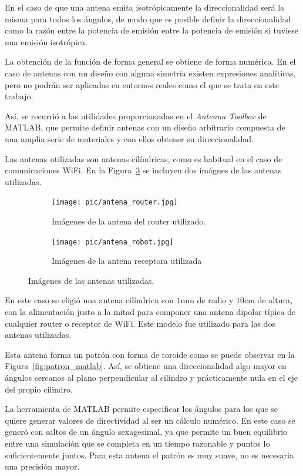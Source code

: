 En el caso de que una antena emita isotrópicamente la direccionalidad será la misma para todos los ángulos, de modo que es posible definir la direccionalidad como la razón entre la potencia de emisión entre la potencia de emisión si tuviese una emisión isotrópica.

La obtención de la función de forma general se obtiene de forma numérica.
En el caso de antenas con un diseño con alguna simetría existen expresiones analíticas, pero no podrán ser aplicadas en entornos reales como el que se trata en este trabajo.

Así, se recurrió a las utilidades proporcionadas en el \textit{Antenna Toolbox} de MATLAB, que permite definir antenas con un diseño arbitrario compuesta de una amplia serie de materiales y con ellos obtener su direccionalidad.\cite{MATLAB}

Las antenas utilizadas son antenas cilíndricas, como es habitual en el caso de comunicaciones WiFi.
En la Figura~\ref{fig:antenas} se incluyen dos imágnes de las antenas utilizadas.

\begin{figure}[H]
    \centering
    \begin{subfigure}[b]{0.45\textwidth}
        \centering
        \texttt{[image: pic/antena\_router.jpg]}
        \caption{Imágenes de la antena del router utilizado.}
        \label{fig:antena_router}
    \end{subfigure}
    \begin{subfigure}[b]{0.45\textwidth}
        \centering
        \texttt{[image: pic/antena\_robot.jpg]} 
        \caption{Imágenes de la antena receptora utilizada}
        \label{fig:antena_receptor}
    \end{subfigure}
    \caption{Imágenes de las antenas utilizadas.}
    \label{fig:antenas}
\end{figure}

En este caso se eligió una antena cilíndrica con $1\si{\milli\meter}$ de radio y $10\si{\centi\meter}$ de altura, con la alimentación justo a la mitad para componer una antena dipolar típica de cualquier router o receptor de WiFi.
Este modelo fue utilizado para las dos antenas utilizadas.

Esta antena forma un patrón con forma de toroide como se puede observar en la Figura~\ref{fig:patron_matlab}.
Así, se obtiene una direccionalidad algo mayor en ángulos cercanos al plano perpendicular al cilindro y prácticamente nula en el eje del propio cilindro.

La herramienta de MATLAB permite especificar los ángulos para los que se quiere generar valores de directividad al ser un cálculo numérico.
En este caso se generó con saltos de un ángulo sexagesimal, ya que permite un buen equilibrio entre una simulación que se completa en un tiempo razonable y puntos lo suficientemente juntos.
Para esta antena el patrón es muy suave, no es necesaria una precisión mayor.

